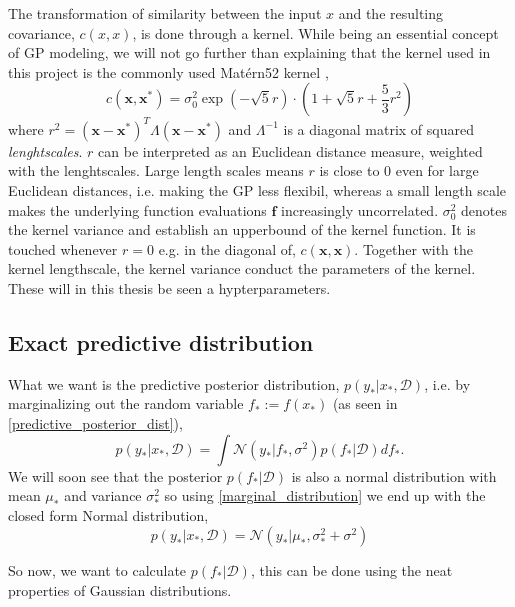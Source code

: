 \begin{testexample}
    The transformation of similarity between the input $x$ and the resulting covariance, $c(x,x)$, is
    done through a kernel. While being an essential concept of GP modeling, we will not go further
    than explaining that the kernel used in this project is the commonly used Matérn52 kernel
    \cite[157]{TakeHumanOutOfLoop},
    $$c(\textbf{x},\textbf{x}^*) = \sigma_0^2 \exp(-\sqrt{5}r)\cdot \left(
    1+\sqrt{5}r+\frac{5}{3}r^2 \right)$$ where $r^2 = (\textbf{x}-\textbf{x}^*)^T \Lambda
    (\textbf{x}-\textbf{x}^*)$ and $\Lambda^{-1}$ is a diagonal matrix of squared
    \textit{lenghtscales}. $r$ can be interpreted as an Euclidean distance measure, weighted with
    the lenghtscales. Large length scales means $r$ is close to 0 even for large Euclidean distances, i.e.
    making the GP less flexibil, whereas a small length scale makes the underlying function
    evaluations $\textbf{f}$ increasingly uncorrelated. $\sigma_0^2$ denotes the kernel variance and
    establish an upperbound of the kernel function. It is touched whenever $r=0$ e.g. in the
    diagonal of, $c(\textbf{x}, \textbf{x})$. Together with the kernel lengthscale, the kernel variance conduct the 
    parameters of the kernel. These will in this thesis be seen a hypterparameters. 
\end{testexample}

\subsection{Exact predictive distribution}
What we want is the predictive posterior distribution, $p(y_*|x_*, \mathcal{D})$, i.e. by
marginalizing out the random variable $f_* := f(x_*)$ (as seen in
\eqref{predictive_posterior_dist}),
\begin{equation}\label{GP_predictive}
    p(y_*|x_*,\mathcal{D}) = \int \mathcal{N}(y_*|f_*, \sigma^2) p(f_*|\mathcal{D})df_*.
\end{equation}
We will soon see that the posterior $p(f_*|\mathcal{D})$ is also a normal distribution 
with mean $\mu_*$ and variance $\sigma^2_*$ so
using \eqref{marginal_distribution} we end up with the closed form Normal distribution, 
$$p(y_*|x_*,\mathcal{D}) = \mathcal{N}(y_*|\mu_*,\sigma^2_*+\sigma^2)$$

So now, we want to calculate $p(f_*|\mathcal{D})$, this can be done using the neat properties of Gaussian
distributions. 


